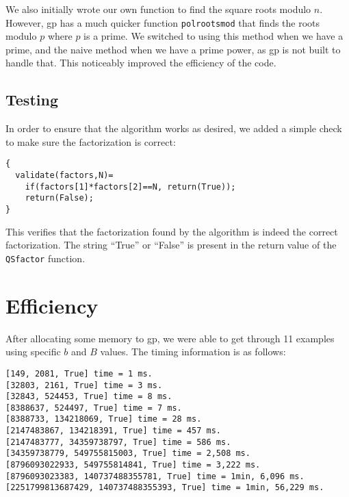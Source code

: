 \documentclass[titlepage]{article}
\begin{document}
		We also initially wrote our own function to find the square roots modulo $n$. However, gp has a much quicker function \verb|polrootsmod| that finds the roots modulo $p$ where $p$ is a prime. We switched to using this method when we have a prime, and the naive method when we have a prime power, as gp is not built to handle that. This noticeably improved the efficiency of the code.
	
		\subsection{Testing}
		In order to ensure that the algorithm works as desired, we added a simple check to make sure the factorization is correct:
\begin{verbatim}
{
  validate(factors,N)=
    if(factors[1]*factors[2]==N, return(True));
    return(False);
}
\end{verbatim}
	
	This verifies that the factorization found by the algorithm is indeed the correct factorization. The string ``True'' or ``False'' is present in the return value of the \verb|QSfactor| function.
	
	\section{Efficiency}
	
	After allocating some memory to gp, we were able to get through 11 examples using specific $b$ and $B$ values. The timing information is as follows: 
	\begin{verbatim}
[149, 2081, True] time = 1 ms.
[32803, 2161, True] time = 3 ms.
[32843, 524453, True] time = 8 ms.
[8388637, 524497, True] time = 7 ms.
[8388733, 134218069, True] time = 28 ms.
[2147483867, 134218391, True] time = 457 ms.
[2147483777, 34359738797, True] time = 586 ms.
[34359738779, 549755815003, True] time = 2,508 ms.
[8796093022933, 549755814841, True] time = 3,222 ms.
[8796093023383, 140737488355781, True] time = 1min, 6,096 ms.
[2251799813687429, 140737488355393, True] time = 1min, 56,229 ms.
	\end{verbatim}
		
\end{document}
